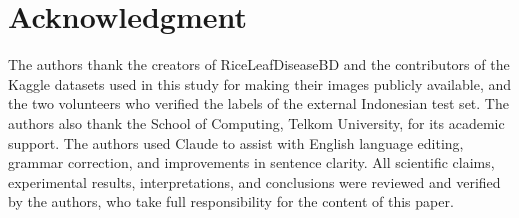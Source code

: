 \documentclass[conference,a4paper]{IEEEtran}
\begin{document}
\section*{Acknowledgment}
The authors thank the creators of RiceLeafDiseaseBD and the contributors of the Kaggle datasets used in this study for making their images publicly available, and the two volunteers who verified the labels of the external Indonesian test set. The authors also thank the School of Computing, Telkom University, for its academic support. The authors used Claude to assist with English language editing, grammar correction, and improvements in sentence clarity. All scientific claims, experimental results, interpretations, and conclusions were reviewed and verified by the authors, who take full responsibility for the content of this paper.




\end{document}
